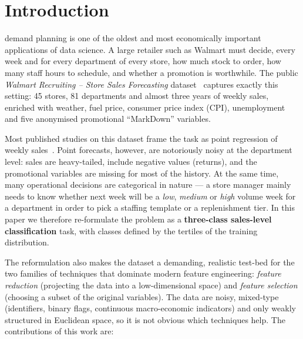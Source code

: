 \section{Introduction}
 demand planning is one of the oldest and most economically important applications of data science. A large retailer such as Walmart must decide, every week and for every department of every store, how much stock to order, how many staff hours to schedule, and whether a promotion is worthwhile. The public \emph{Walmart Recruiting -- Store Sales Forecasting} dataset~\cite{kaggle_walmart} captures exactly this setting: 45 stores, 81 departments and almost three years of weekly sales, enriched with weather, fuel price, consumer price index (CPI), unemployment and five anonymised promotional ``MarkDown'' variables.

Most published studies on this dataset frame the task as point regression of weekly sales~\cite{chen2022,akande2022,yao2023,chenwi2024,punati2025}. Point forecasts, however, are notoriously noisy at the department level: sales are heavy-tailed, include negative values (returns), and the promotional variables are missing for most of the history. At the same time, many operational decisions are categorical in nature --- a store manager mainly needs to know whether next week will be a \emph{low}, \emph{medium} or \emph{high} volume week for a department in order to pick a staffing template or a replenishment tier. In this paper we therefore re-formulate the problem as a \textbf{three-class sales-level classification} task, with classes defined by the tertiles of the training distribution.

The reformulation also makes the dataset a demanding, realistic test-bed for the two families of techniques that dominate modern feature engineering: \emph{feature reduction} (projecting the data into a low-dimensional space) and \emph{feature selection} (choosing a subset of the original variables). The data are noisy, mixed-type (identifiers, binary flags, continuous macro-economic indicators) and only weakly structured in Euclidean space, so it is not obvious which techniques help. The contributions of this work are:

